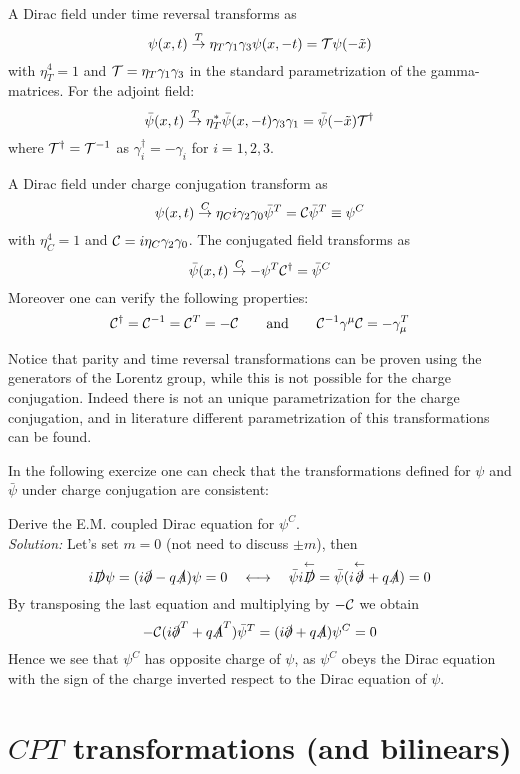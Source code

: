 \documentclass[TheoreticalPhy_ModB.tex]{subfiles}
\begin{document}
A Dirac field under time reversal transforms as
\[\psi(x,t)\overset{T}{\to}\eta_T\gamma_1\gamma_3\psi(x,-t)=\mathcal T\psi(-\tilde x)\]
with $\eta_T^4=1$ and $\mathcal T=\eta_T\gamma_1\gamma_3$ in the standard parametrization of the gamma-matrices. For the adjoint field:
\[\bar\psi(x,t)\overset{T}{\to}\eta_T^*\bar\psi(x,-t)\gamma_3\gamma_1=\bar\psi(-\tilde x)\mathcal T^\dagger\]
where $\mathcal T^\dagger=\mathcal T^{-1}$ as $\gamma_i^\dagger=-\gamma_i$ for $i=1,2,3$.

A Dirac field under charge conjugation transform as
\[\psi(x,t)\overset{C}{\to}\eta_Ci\gamma_2\gamma_0\bar\psi^T=\mathcal C\bar\psi^T\equiv \psi^C\]
with $\eta_C^4=1$ and $\mathcal C=i\eta_C\gamma_2\gamma_0$. The conjugated field transforms as
\[\bar\psi(x, t)\overset{C}{\to}-\psi^T\mathcal C^\dagger=\bar\psi^C\]
Moreover one can verify the following properties:
\[\mathcal C^\dagger=\mathcal C^{-1}=\mathcal C^T=-\mathcal C\qquad\text{and}\qquad\mathcal C^{-1}\gamma^\mu\mathcal C=-\gamma_\mu^T\]

Notice that parity and time reversal transformations can be proven using the generators of the Lorentz group, while this is not possible for the charge conjugation. Indeed there is not an unique parametrization for the charge conjugation, and in literature different parametrization of this transformations can be found.

In the following exercize one can check that the transformations defined for $\psi$ and $\bar \psi$ under charge conjugation are consistent:

\begin{exercise}

Derive the E.M. coupled Dirac equation for $\psi^C$.\\

\textit{Solution:} Let's set $m=0$ (not need to discuss $\pm m$), then
\[i\slashed D\psi=(i\slashed \partial-q\slashed A)\psi=0\quad\longleftrightarrow\quad\bar\psi i\overset{\leftarrow}{\slashed D}=\bar\psi(i\overset{\leftarrow}{\slashed \partial}+q\slashed A)=0\]
By transposing the last equation and multiplying by $-\mathcal C$ we obtain
\[-\mathcal C(i\slashed\partial ^T+q\slashed A^T)\bar\psi^T=(i\slashed \partial+q\slashed A)\psi^C=0\]
Hence we see that $\psi^C$ has opposite charge of $\psi$, as $\psi^C$ obeys the Dirac equation with the sign of the charge inverted respect to the Dirac equation of $\psi$.

\end{exercise}

\section{$CPT$ transformations (and bilinears)}
\end{document}
